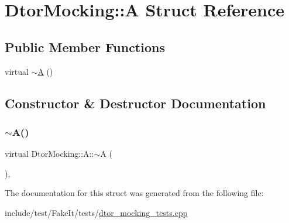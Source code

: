 \hypertarget{structDtorMocking_1_1A}{}\section{Dtor\+Mocking\+::A Struct Reference}
\label{structDtorMocking_1_1A}
\subsection*{Public Member Functions}
\begin{DoxyCompactItemize}
\item 
virtual \mbox{\hyperlink{structDtorMocking_1_1A_a62553e4643098a3137902d587f65b07a}{$\sim$A}} ()
\end{DoxyCompactItemize}


\subsection{Constructor \& Destructor Documentation}
\mbox{\label{structDtorMocking_1_1A_a62553e4643098a3137902d587f65b07a}} 
\subsubsection{\texorpdfstring{$\sim$A()}{~A()}}
{\footnotesize\ttfamily virtual Dtor\+Mocking\+::\+A\+::$\sim$A (\begin{DoxyParamCaption}{ }\end{DoxyParamCaption})\hspace{0.3cm}{\ttfamily [inline]}, {\ttfamily [virtual]}}



The documentation for this struct was generated from the following file\+:\begin{DoxyCompactItemize}
\item 
include/test/\+Fake\+It/tests/\mbox{\hyperlink{dtor__mocking__tests_8cpp}{dtor\+\_\+mocking\+\_\+tests.\+cpp}}\end{DoxyCompactItemize}
